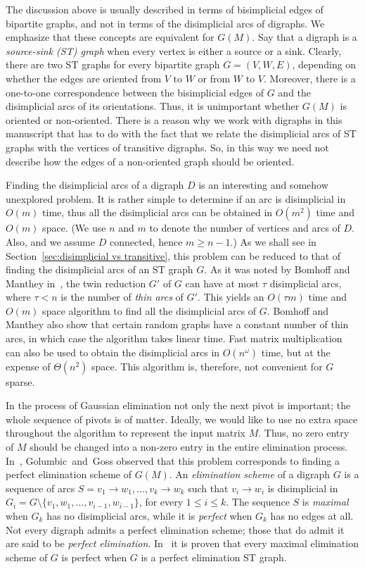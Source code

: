 \documentclass[a4paper,11pt]{article}
\begin{document}
The discussion above is usually described in terms of bisimplicial edges of bipartite graphs, and not in terms of the disimplicial arcs of digraphs.  We emphasize that these concepts are equivalent for $G(M)$.  Say that a digraph is a \emph{source-sink (ST) graph} when every vertex is either a source or a sink.  Clearly, there are two ST graphs for every bipartite graph $G = (V, W, E)$, depending on whether the edges are oriented from $V$ to $W$ or from $W$ to $V$.  Moreover, there is a one-to-one correspondence between the bisimplicial edges of $G$ and the disimplicial arcs of its orientations.  Thus, it is unimportant whether $G(M)$ is oriented or non-oriented.  There is a reason why we work with digraphs in this manuscript that has to do with the fact that we relate the disimplicial arcs of ST graphs with the vertices of transitive digraphs.  So, in this way we need not describe how the edges of a non-oriented graph should be oriented.

Finding the disimplicial arcs of a digraph $D$ is an interesting and somehow unexplored problem.  It is rather simple to determine if an arc is disimplicial in $O(m)$ time, thus all the disimplicial arcs can be obtained in $O(m^2)$ time and $O(m)$ space.  (We use $n$ and $m$ to denote the number of vertices and arcs of $D$.  Also, and we assume $D$ connected, hence $m \geq n-1$.)  As we shall see in Section~\ref{sec:disimplicial vs transitive}, this problem can be reduced to that of finding the disimplicial arcs of an ST graph $G$.  As it was noted by Bomhoff and Manthey in~\cite{BomhoffMantheyDAM2013}, the twin reduction $G'$ of $G$ can have at most $\tau$ disimplicial arcs, where $\tau < n$ is the number of \emph{thin arcs} of $G'$.  This yields an $O(\tau m)$ time and $O(m)$ space algorithm to find all the disimplicial arcs of $G$.  Bomhoff and Manthey also show that certain random graphs have a constant number of thin arcs, in which case the algorithm takes linear time.  Fast matrix multiplication can also be used to obtain the disimplicial arcs in $O(n^\omega)$ time, but at the expense of $\Theta(n^2)$ space.  This algorithm is, therefore, not convenient for $G$ sparse.

In the process of Gaussian elimination not only the next pivot is important; the whole sequence of pivots is of matter.  Ideally, we would like to use no extra space throughout the algorithm to represent the input matrix $M$.  Thus, no zero entry of $M$ should be changed into a non-zero entry in the entire elimination process.  In~\cite{GolumbicGossJGT1978}, Golumbic~and~Goss observed that this problem corresponds to finding a perfect elimination scheme of $G(M)$.  An \emph{elimination scheme} of a digraph $G$ is a sequence of arcs $S=v_1 \to w_1, \ldots, v_k \to w_k$ such that $v_i \to w_i$ is disimplicial in $G_i = G \setminus \{v_1, w_1, \ldots, v_{i-1}, w_{i-1}\}$, for every $1 \leq i \leq k$.  The sequence $S$ is \emph{maximal} when $G_k$ has no disimplicial arcs, while it is \emph{perfect} when $G_k$ has no edges at all.  Not every digraph admits a perfect elimination scheme; those that do admit it are said to be \emph{perfect elimination}.  In~\cite{GolumbicGossJGT1978} it is proven that every maximal elimination scheme of $G$ is perfect when $G$ is a perfect elimination ST graph.  
\end{document}
